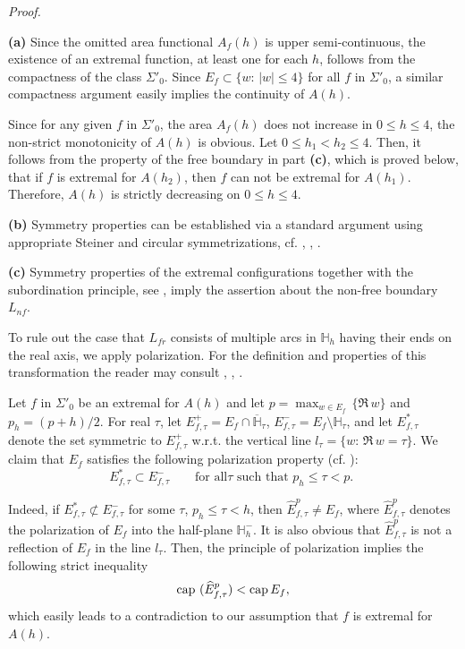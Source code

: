 \documentclass[mn,a4paper,fleqn]{w-art}
\newcommand{\CAP}{{\rm cap}\,}
\newcommand{\be}{\begin{equation}}
\newcommand{\ee}{\end{equation}}
\begin{document}
{\it Proof.}  {\textbf{(a)} Since the omitted area functional
$A_f(h)$ is upper semi-continuous, the existence of an extremal
function, at least one for each $h$, follows from the compactness
of the class ${\Sigma'}_0$. Since $E_f\subset \{w:\,|w|\le 4\}$ for
all $f$ in $\Sigma'_0$, a similar compactness argument easily implies
the continuity of $A(h)$.

Since for any given $f$ in $\Sigma'_0$, the area $A_f(h)$ does not
increase in $0\le h\le 4$, the non-strict monotonicity of $A(h)$
is obvious. Let $0\le h_1<h_2\le 4$. Then, it follows from the
property of the free boundary in part \textbf{(c)}, which is
proved below, that if $f$ is extremal for $A(h_2)$, then $f$ can
not be extremal for $A(h_1)$. Therefore, $A(h)$ is strictly
decreasing on $0\le h\le 4$.

\textbf{(b)}  Symmetry properties can be established via a
standard argument using appropriate Steiner and circular
symmetrizations, cf. \cite{BS}, \cite{BPS1}, \cite{BRS1}.

\textbf{(c)}  Symmetry properties of the extremal configurations
together with the subordination principle, see \cite{H}, imply the
assertion about the non-free boundary $L_{nf}$.

To rule out the case that $L_{fr}$ consists of multiple arcs in
$\mathbb{H}_h$ having their ends on the real axis, we apply
polarization. For the definition and properties of this
transformation the reader may consult \cite{D}, \cite{S},
\cite{BS}.

Let $f$ in $\Sigma'_0$ be an extremal for $A(h)$ and let
$p=\max_{w\in E_f} \,\{\Re \,w\}$ and $p_h=(p+h)/2$. For real
$\tau$, let $E_{f,\tau}^+=E_f\cap \overline{\mathbb{H}}_\tau$,
$E_{f,\tau}^-=E_f\setminus \mathbb{H}_\tau$, and let
$E_{f,\tau}^*$ denote the set symmetric to $E_{f,\tau}^+$ w.r.t.
the vertical line $l_\tau=\{w:\,\Re \,w=\tau\}$. We claim that $E_f$
satisfies the following polarization property (cf. \cite{BS}): %
\be \label{equation polar} %
E_{f,\tau}^*\subset E_{f,\tau}^- \quad \quad {\mbox{for all
$\tau$ such that $p_h\le \tau<p$.  }} %
\ee  %

Indeed, if $E^*_{f,\tau}\not\subset E_{f,\tau}^-$ for some $\tau$,
$p_h\le \tau<h$, then $\widehat{E}_{f,\tau}^p\not=E_f$, where
$\widehat{E}_{f,\tau}^p$ denotes the polarization of $E_f$ into
the half-plane $\mathbb{H}_h^-$. It is also obvious that
$\widehat{E}_{f,\tau}^p$ is not a reflection of $E_f$ in the line
$l_\tau$. Then, the principle of polarization implies the following strict inequality %
$$ %
\CAP\,(\widehat{E}_{f,\tau}^p)<\CAP E_f, %
$$  %
which easily leads to a contradiction to our assumption that $f$
is extremal for $A(h)$.

}
\end{document}
